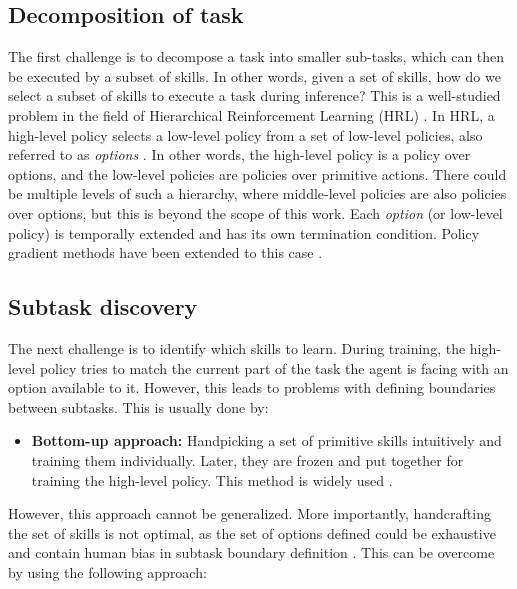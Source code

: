 \subsection{Decomposition of task}
The first challenge is to decompose a task into smaller sub-tasks, which can then be executed by a subset of skills. 
In other words, given a set of skills, how do we select a subset of skills to execute a task during inference? This is a well-studied problem in the field of Hierarchical Reinforcement Learning (HRL) \cite{hutsebaut-buysseHierarchicalReinforcementLearning2022}. 
In HRL, a high-level policy selects a low-level policy from a set of low-level policies, also referred to as \textit{options} \cite{suttonMDPsSemiMDPsFramework1999}. 
In other words, the high-level policy is a policy over options, and the low-level policies are policies over primitive actions. 
There could be multiple levels of such a hierarchy, where middle-level policies are also policies over options, but this is beyond the scope of this work. 
Each \textit{option} (or low-level policy) is temporally extended and has its own termination condition. Policy gradient methods have been extended to this case \cite{baconOptionCriticArchitecture2017}.

\subsection{Subtask discovery}
The next challenge is to identify which skills to learn. 
During training, the high-level policy tries to match the current part of the task the agent is facing with an option available to it. 
However, this leads to problems with defining boundaries between subtasks. This is usually done by:

\begin{itemize}
\item \textbf{Bottom-up approach:} 
Handpicking a set of primitive skills intuitively and training them individually. Later, they are frozen and put together for training the high-level policy. This method is widely used \cite{pateriaHierarchicalReinforcementLearning2021}.
\end{itemize}

However, this approach cannot be generalized. More importantly, handcrafting the set of skills is not optimal, as the set of options defined could be exhaustive and contain human bias in subtask boundary definition \cite{silverWelcomeEraExperience}. This can be overcome by using the following approach:

